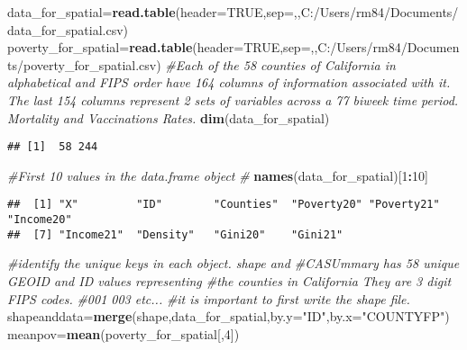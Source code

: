 \documentclass[
]{article}
\newenvironment{Shaded}{\begin{snugshade}}{\end{snugshade}}
\newcommand{\AttributeTok}[1]{\textcolor[rgb]{0.13,0.29,0.53}{#1}}
\newcommand{\CommentTok}[1]{\textcolor[rgb]{0.56,0.35,0.01}{\textit{#1}}}
\newcommand{\ConstantTok}[1]{\textcolor[rgb]{0.56,0.35,0.01}{#1}}
\newcommand{\DecValTok}[1]{\textcolor[rgb]{0.00,0.00,0.81}{#1}}
\newcommand{\FunctionTok}[1]{\textcolor[rgb]{0.13,0.29,0.53}{\textbf{#1}}}
\newcommand{\NormalTok}[1]{#1}
\newcommand{\OtherTok}[1]{\textcolor[rgb]{0.56,0.35,0.01}{#1}}
\newcommand{\SpecialCharTok}[1]{\textcolor[rgb]{0.81,0.36,0.00}{\textbf{#1}}}
\newcommand{\StringTok}[1]{\textcolor[rgb]{0.31,0.60,0.02}{#1}}
\begin{document}
\begin{Shaded}
\begin{Highlighting}[]
\NormalTok{data\_for\_spatial}\OtherTok{=}\FunctionTok{read.table}\NormalTok{(}\AttributeTok{header=}\ConstantTok{TRUE}\NormalTok{,}\AttributeTok{sep=}\StringTok{\textquotesingle{},\textquotesingle{}}\NormalTok{,}\StringTok{\textquotesingle{}C:/Users/rm84/Documents/data\_for\_spatial.csv\textquotesingle{}}\NormalTok{)}
\NormalTok{poverty\_for\_spatial}\OtherTok{=}\FunctionTok{read.table}\NormalTok{(}\AttributeTok{header=}\ConstantTok{TRUE}\NormalTok{,}\AttributeTok{sep=}\StringTok{\textquotesingle{},\textquotesingle{}}\NormalTok{,}\StringTok{\textquotesingle{}C:/Users/rm84/Documents/poverty\_for\_spatial.csv\textquotesingle{}}\NormalTok{)}
\CommentTok{\#Each of the 58 counties of California in alphabetical and FIPS order have 164 columns of information associated with it. The last 154 columns represent 2 sets of variables across a 77 biweek time period. Mortality and Vaccinations Rates.}
\FunctionTok{dim}\NormalTok{(data\_for\_spatial)}
\end{Highlighting}
\end{Shaded}

\begin{verbatim}
## [1]  58 244
\end{verbatim}

\begin{Shaded}
\begin{Highlighting}[]
\CommentTok{\#First 10 values in the data.frame object}
\CommentTok{\#}
\FunctionTok{names}\NormalTok{(data\_for\_spatial)[}\DecValTok{1}\SpecialCharTok{:}\DecValTok{10}\NormalTok{]}
\end{Highlighting}
\end{Shaded}

\begin{verbatim}
##  [1] "X"         "ID"        "Counties"  "Poverty20" "Poverty21" "Income20" 
##  [7] "Income21"  "Density"   "Gini20"    "Gini21"
\end{verbatim}

\begin{Shaded}
\begin{Highlighting}[]
\CommentTok{\#identify the unique keys in each object. shape and \#CASUmmary has 58 unique GEOID and ID values representing \#the counties in California They are 3 digit FIPS codes.}
\CommentTok{\#001 003 etc...}
\CommentTok{\#it is important to first write the shape file.}
\NormalTok{shapeanddata}\OtherTok{=}\FunctionTok{merge}\NormalTok{(shape,data\_for\_spatial,}\AttributeTok{by.y=}\StringTok{"ID"}\NormalTok{,}\AttributeTok{by.x=}\StringTok{"COUNTYFP"}\NormalTok{)}
\NormalTok{meanpov}\OtherTok{=}\FunctionTok{mean}\NormalTok{(poverty\_for\_spatial[,}\DecValTok{4}\NormalTok{])}
\end{Highlighting}
\end{Shaded}
\end{document}
